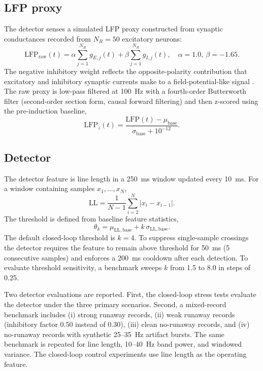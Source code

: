 \documentclass[12pt]{article}
\begin{document}
\subsection{LFP proxy}
The detector senses a simulated LFP proxy constructed from synaptic conductances recorded from \(N_R=50\) excitatory neurons:
\begin{equation}
\mathrm{LFP}_{\mathrm{raw}}(t)
= \alpha \sum_{j=1}^{N_R} g_{E,j}(t) + \beta \sum_{j=1}^{N_R} g_{I,j}(t),
\quad
\alpha=1.0,\ \beta=-1.65.
\end{equation}
The negative inhibitory weight reflects the opposite-polarity contribution that excitatory and inhibitory synaptic currents make to a field-potential-like signal \cite{einevoll2013,mazzoni2008}. The raw proxy is low-pass filtered at 100~Hz with a fourth-order Butterworth filter (second-order section form, causal forward filtering) and then z-scored using the pre-induction baseline,
\begin{equation}
\mathrm{LFP}_{z}(t) = \frac{\mathrm{LFP}(t)-\mu_{\mathrm{base}}}{\sigma_{\mathrm{base}}+10^{-12}}.
\end{equation}

\subsection{Detector}
The detector feature is line length in a 250~ms window updated every 10~ms. For a window containing samples \(x_1,\ldots,x_N\),
\begin{equation}
\mathrm{LL} = \frac{1}{N-1}\sum_{i=2}^{N}|x_i-x_{i-1}|.
\end{equation}
The threshold is defined from baseline feature statistics,
\begin{equation}
\theta_k = \mu_{\mathrm{LL,base}} + k\,\sigma_{\mathrm{LL,base}}.
\end{equation}
The default closed-loop threshold is \(k=4\). To suppress single-sample crossings the detector requires the feature to remain above threshold for 50~ms (5 consecutive samples) and enforces a 200~ms cooldown after each detection. To evaluate threshold sensitivity, a benchmark sweeps \(k\) from 1.5 to 8.0 in steps of 0.25.

Two detector evaluations are reported. First, the closed-loop stress tests evaluate the detector under the three primary scenarios. Second, a mixed-record benchmark includes (i) strong runaway records, (ii) weak runaway records (inhibitory factor 0.50 instead of 0.30), (iii) clean no-runaway records, and (iv) no-runaway records with synthetic 25--35~Hz artifact bursts. The same benchmark is repeated for line length, 10--40~Hz band power, and windowed variance. The closed-loop control experiments use line length as the operating feature.
\end{document}

